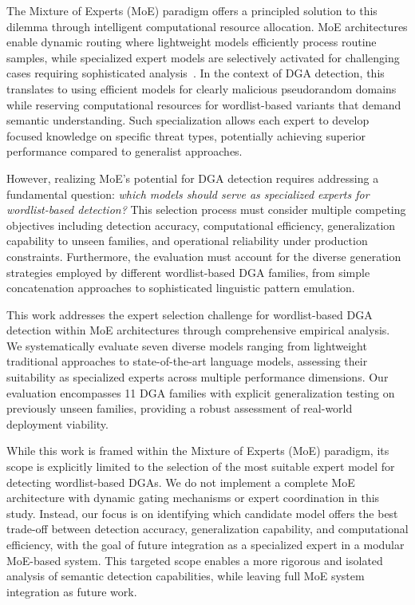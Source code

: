 \documentclass[a4paper]{llncs}
\begin{document}
The Mixture of Experts (MoE) paradigm offers a principled solution to this dilemma through intelligent computational resource allocation. MoE architectures enable dynamic routing where lightweight models efficiently process routine samples, while specialized expert models are selectively activated for challenging cases requiring sophisticated analysis~\cite{shazeer2017outrageously}. In the context of DGA detection, this translates to using efficient models for clearly malicious pseudorandom domains while reserving computational resources for wordlist-based variants that demand semantic understanding. Such specialization allows each expert to develop focused knowledge on specific threat types, potentially achieving superior performance compared to generalist approaches.

However, realizing MoE's potential for DGA detection requires addressing a fundamental question: \textit{which models should serve as specialized experts for wordlist-based detection?} This selection process must consider multiple competing objectives including detection accuracy, computational efficiency, generalization capability to unseen families, and operational reliability under production constraints. Furthermore, the evaluation must account for the diverse generation strategies employed by different wordlist-based DGA families, from simple concatenation approaches to sophisticated linguistic pattern emulation.

This work addresses the expert selection challenge for wordlist-based DGA detection within MoE architectures through comprehensive empirical analysis. We systematically evaluate seven diverse models ranging from lightweight traditional approaches to state-of-the-art language models, assessing their suitability as specialized experts across multiple performance dimensions. Our evaluation encompasses 11 DGA families with explicit generalization testing on previously unseen families, providing a robust assessment of real-world deployment viability.

While this work is framed within the Mixture of Experts (MoE) paradigm, its scope is explicitly limited to the selection of the most suitable expert model for detecting wordlist-based DGAs. We do not implement a complete MoE architecture with dynamic gating mechanisms or expert coordination in this study. Instead, our focus is on identifying which candidate model offers the best trade-off between detection accuracy, generalization capability, and computational efficiency, with the goal of future integration as a specialized expert in a modular MoE-based system. This targeted scope enables a more rigorous and isolated analysis of semantic detection capabilities, while leaving full MoE system integration as future work.
\end{document}

